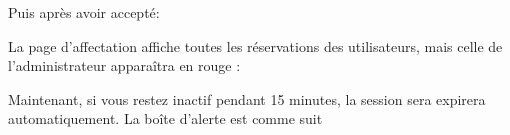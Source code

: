 \documentclass{article}
\begin{document}
\begin{enumerate}
   Puis après avoir accepté:
  
  \vspace{0.7cm}
               \hspace*{-0.7in}

               \noindent{}
  
  
  
  \newpage 
  La page d'affectation affiche toutes les réservations des utilisateurs, mais celle de l'administrateur apparaîtra en rouge :
  
  \vspace{0.7cm}
               \hspace*{-0.7in}
               \noindent{}
               
               
    \vspace{4cm}           
               Maintenant, si vous restez inactif pendant 15 minutes, la session sera expirera automatiquement. La boîte d'alerte est comme suit
  

\end{enumerate}
\end{document}
